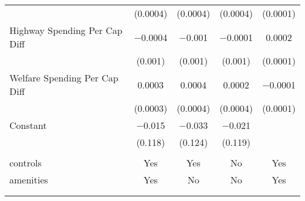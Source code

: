 \begin{table}[!htbp]
\begin{tabular}{@{\extracolsep{5pt}}lcccc}
  & (0.0004) & (0.0004) & (0.0004) & (0.0001) \\ 
  Highway Spending Per Cap Diff & $-$0.0004 & $-$0.001 & $-$0.0001 & 0.0002 \\ 
  & (0.001) & (0.001) & (0.001) & (0.0001) \\ 
  Welfare Spending Per Cap Diff & 0.0003 & 0.0004 & 0.0002 & $-$0.0001 \\ 
  & (0.0003) & (0.0004) & (0.0004) & (0.0001) \\ 
  Constant & $-$0.015 & $-$0.033 & $-$0.021 &  \\ 
  & (0.118) & (0.124) & (0.119) &  \\ 
 \hline \\[-1.8ex] 
controls & Yes & Yes & No & Yes \\ 
amenities & Yes & No & No & Yes \\ 
\hline \\[-1.8ex] 
\hline 
\hline \\[-1.8ex] 
\end{tabular} 
\end{table} 

